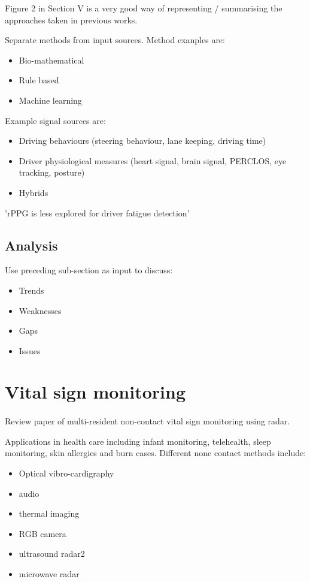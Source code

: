 \documentclass[11pt, parskip=half*,twoside=false]{scrbook}
\begin{document}
Figure 2 in Section \textsc{V} is a very good way of representing / summarising the approaches taken in previous works.

Separate methods from input sources.  Method exanples are:
\begin{itemize}
	\item Bio-mathematical
	\item Rule based
	\item Machine learning
\end{itemize}

Example signal sources are:
\begin{itemize}
	\item Driving behaviours (steering behaviour, lane keeping, driving time)
	\item Driver physiological measures (heart signal, brain signal, PERCLOS, eye tracking, posture)
	\item Hybrids
\end{itemize}

'rPPG is less explored for driver fatigue detection'


\subsection{Analysis}
Use preceding sub-section as input to discuss:
\begin{itemize}
	\item Trends
	\item Weaknesses
	\item Gaps
	\item Issues
\end{itemize}


\section{Vital sign monitoring}

\paragraph{\citep{singhMultiResidentNonContactVital2021}} Review paper of multi-resident non-contact vital sign monitoring using radar.

Applications in health care including infant monitoring, telehealth, sleep monitoring, skin allergies and burn cases.  Different none contact methods include:
\begin{itemize}
	\item Optical vibro-cardigraphy
	\item audio
	\item thermal imaging
	\item RGB camera
	\item ultrasound radar2
	\item microwave radar
\end{itemize}
\end{document}
